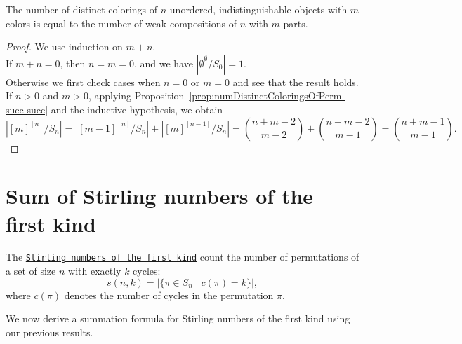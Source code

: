 \begin{proposition}
  \label{prop:numDistinctColoringsOfPerm-eq-numWeakCompositions}
  \leanok
  The number of distinct colorings of $n$ unordered, indistinguishable objects with $m$ colors is equal to the number of weak compositions of $n$ with $m$ parts.
\end{proposition}

\begin{proof}
  \leanok
  We use induction on $m + n$. \\
  If $m + n = 0$, then $n = m = 0$, and we have $|\emptyset^\emptyset / S_0| = 1$. \\
  Otherwise we first check cases when $n = 0$ or $m = 0$ and see that the result holds. \\
  If $n > 0$ and $m > 0$, applying Proposition~\ref{prop:numDistinctColoringsOfPerm-succ-succ} and the inductive hypothesis, we obtain
  \begin{equation*}
    |[m]^{[n]}/S_n| = |[m - 1]^{[n]}/S_n| + |[m]^{[n - 1]}/S_n| = \binom{n + m - 2}{m - 2} + \binom{n + m - 2}{m - 1} = \binom{n + m - 1}{m - 1}.
  \end{equation*}
\end{proof}

\section{Sum of Stirling numbers of the first kind}

\begin{definition}
  \label{def:stirlingFirstKind}
  \leanok
  The \href{https://en.wikipedia.org/wiki/Stirling_numbers_of_the_first_kind}{\texttt{Stirling numbers of the first kind}} count the number of permutations of a set of size $n$ with exactly $k$ cycles:
  \begin{equation*}
    s(n, k) = |\{\pi \in S_n \mid c(\pi) = k\}|,
  \end{equation*}
  where $c(\pi)$ denotes the number of cycles in the permutation $\pi$.
\end{definition}

We now derive a summation formula for Stirling numbers of the first kind using our previous results.

